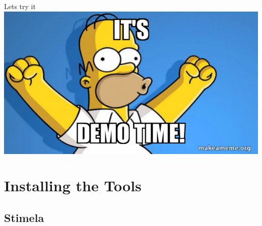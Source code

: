 \documentclass[ignorenonframetext]{beamer}
\begin{document}
\begin{frame}{Lets try it}
\includegraphics[width=\linewidth]{images/demo-time.jpg}
\end{frame}


% 
% 



\section{Installing the Tools}

\subsection{Stimela}
\end{document}
